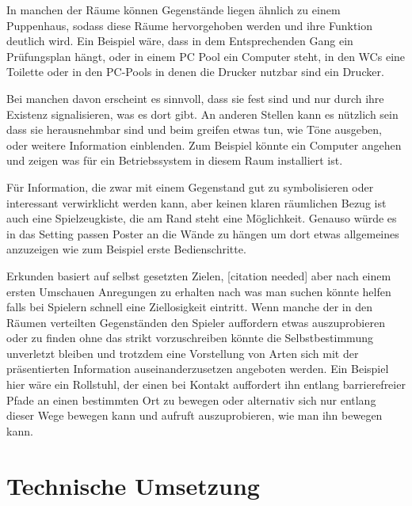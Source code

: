 \documentclass[11pt]{article} %
\begin{document}
In manchen der Räume können Gegenstände liegen ähnlich zu einem Puppenhaus, sodass diese Räume hervorgehoben werden und ihre Funktion deutlich wird. Ein Beispiel wäre, dass in dem Entsprechenden Gang ein Prüfungsplan hängt, oder in einem PC Pool ein Computer steht, in den WCs eine Toilette oder in den PC-Pools in denen die Drucker nutzbar sind ein Drucker.

Bei manchen davon erscheint es sinnvoll, dass sie fest sind und nur durch ihre Existenz signalisieren, was es dort gibt. An anderen Stellen kann es nützlich sein dass sie herausnehmbar sind und beim greifen etwas tun, wie Töne ausgeben, oder weitere Information einblenden. Zum Beispiel könnte ein Computer angehen und zeigen was für ein Betriebssystem in diesem Raum installiert ist.

Für Information, die zwar mit einem Gegenstand gut zu symbolisieren oder interessant verwirklicht werden kann, aber keinen klaren räumlichen Bezug ist auch eine Spielzeugkiste, die am Rand steht eine Möglichkeit. 
Genauso würde es in das Setting passen Poster an die Wände zu hängen um dort etwas allgemeines anzuzeigen wie zum Beispiel erste Bedienschritte.

Erkunden basiert auf selbst gesetzten Zielen, [citation needed] aber nach einem ersten Umschauen Anregungen zu erhalten nach was man suchen könnte helfen falls bei Spielern schnell eine Ziellosigkeit eintritt.
Wenn manche der in den Räumen verteilten Gegenständen den Spieler auffordern etwas auszuprobieren oder zu finden ohne das strikt vorzuschreiben könnte die Selbstbestimmung unverletzt bleiben und trotzdem eine Vorstellung von Arten sich mit der präsentierten Information auseinanderzusetzen angeboten werden. Ein Beispiel hier wäre ein Rollstuhl, der einen bei Kontakt auffordert ihn entlang barrierefreier Pfade an einen bestimmten Ort zu bewegen oder alternativ sich nur entlang dieser Wege bewegen kann und aufruft auszuprobieren, wie man ihn bewegen kann. 




\section{Technische Umsetzung}
\end{document}
